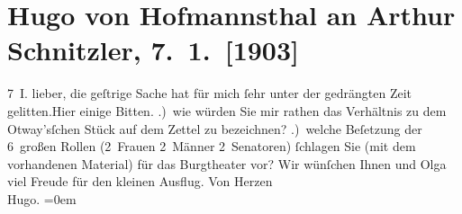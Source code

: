 

         
         \renewcommand{\erwaehntePersonen}{Personen: Thomas Otway, Olga Schnitzler}
         \renewcommand{\erwaehnteInstitutionen}{Institutionen: Burgtheater}
         \renewcommand{\erwaehnteOrte}{Orte: Wien}
         \renewcommand{\erwaehnteWerke}{Werke: Das gerettete Venedig}
               \section[Hugo von Hofmannsthal an Arthur Schnitzler, 7. 1. {[}1903{]}]{ Hugo von Hofmannsthal an Arthur Schnitzler,
               7. 1. {[}1903{]}}\nopagebreak{}\rehead{ }\begin{ledgroupsized}[t]{13cm}\normalsize\beginnumbering \toendnotes[C]{\smallbreak\pagebreak[2]} 
\toendnotes[C]{\smallbreak}\pstart
           \raggedleft{}{\pb}7 I.\pend
           \pstart
           lieber, die geſtrige Sache hat für mich ſehr unter der gedrängten
               Zeit gelitten.\hspace*{2.5em}Hier einige Bitten.\pend
           .) wie würden Sie mir rathen das Verhältnis zu dem Otway’sſchen{ }Stück auf dem Zettel zu
               bezeichnen? \pend
           .) welche Beſetzung der 6 großen Rollen (2 Frauen 2 Männer {\pb}2 Senatoren) ſchlagen Sie
               (mit dem vorhandenen Material) für das Burgtheater
               vor?\pend
           \pstart
           Wir wünſchen Ihnen und Olga viel Freude für den
               kleinen Ausflug.\pend
           \pstart
           Von Herzen{\\[\baselineskip]}\spacefill\mbox{Hugo.}\pend
           \leftskip=0em{}
         
         \endnumbering{}\end{ledgroupsized}  \newcommand{\dateiname}{L01264}\newcommand{\titel}{Hugo von Hofmannsthal an Arthur Schnitzler, 7. 1. [1903]}\newcommand{\editorInnen}{Martin Anton Müller und Gerd-Hermann Susen}
      